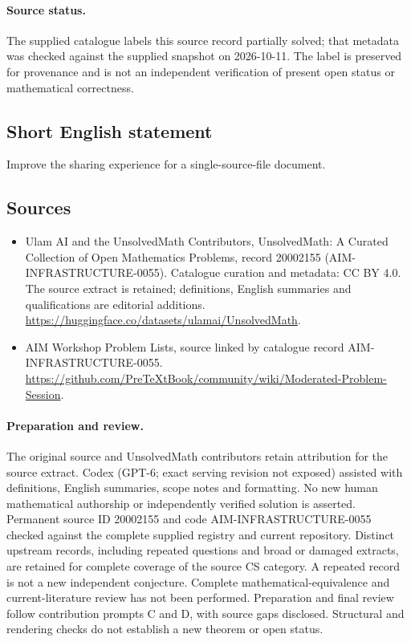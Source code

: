 \documentclass[11pt]{article}
\begin{document}
\paragraph{Source status.}
The supplied catalogue labels this source record partially solved; that metadata was checked against the supplied snapshot on 2026-10-11. The label is preserved for provenance and is not an independent verification of present open status or mathematical correctness.
\subsection{Short English statement}
Improve the sharing experience for a single-source-file document.
\subsection{Sources}
\begin{itemize}
\item[\hypertarget{source:20002155:1}{S1}] Ulam AI and the UnsolvedMath Contributors, UnsolvedMath: A Curated Collection of Open Mathematics Problems, record 20002155 (AIM-INFRASTRUCTURE-0055). Catalogue curation and metadata: CC BY 4.0. The source extract is retained; definitions, English summaries and qualifications are editorial additions.
\url{https://huggingface.co/datasets/ulamai/UnsolvedMath}.
\item[\hypertarget{source:20002155:2}{S2}] AIM Workshop Problem Lists, source linked by catalogue record AIM-INFRASTRUCTURE-0055.
\url{https://github.com/PreTeXtBook/community/wiki/Moderated-Problem-Session}.
\end{itemize}
\paragraph{Preparation and review.}
The original source and UnsolvedMath contributors retain attribution for the source extract. Codex (GPT-6; exact serving revision not exposed) assisted with definitions, English summaries, scope notes and formatting. No new human mathematical authorship or independently verified solution is asserted. Permanent source ID 20002155 and code AIM-INFRASTRUCTURE-0055 checked against the complete supplied registry and current repository. Distinct upstream records, including repeated questions and broad or damaged extracts, are retained for complete coverage of the source CS category. A repeated record is not a new independent conjecture. Complete mathematical-equivalence and current-literature review has not been performed. Preparation and final review follow contribution prompts C and D, with source gaps disclosed. Structural and rendering checks do not establish a new theorem or open status.
\label{end:20002155}
\end{document}
